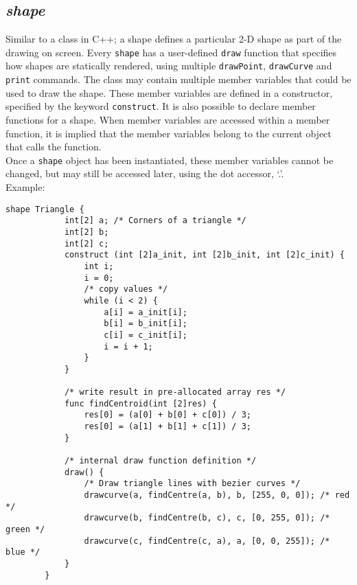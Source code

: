 \documentclass[letterpaper,12pt]{article}
\begin{document}
    \subsection{\textit{shape}}
    Similar to a class in C++; a shape defines a particular 2-D shape as part of the drawing on screen. Every \texttt{shape} has a user-defined \texttt{draw} function that specifies how shapes are statically rendered, using multiple \texttt{drawPoint}, \texttt{drawCurve} and \texttt{print} commands. The class may contain multiple member variables that could be used to draw the shape. These member variables are defined in a constructor, specified by the keyword \texttt{construct}. It is also possible to declare member functions for a shape. When member variables are accessed within a member function, it is implied that the member variables belong to the current object that calls the function.\\
    Once a \texttt{shape} object has been instantiated, these member variables cannot be changed, but may still be accessed later, using the dot accessor, `.'.\\
    Example:\\
    \begin{lstlisting}[style=sol]
        shape Triangle {
            int[2] a; /* Corners of a triangle */
            int[2] b;
            int[2] c;
            construct (int [2]a_init, int [2]b_init, int [2]c_init) {
                int i;
                i = 0;
                /* copy values */
                while (i < 2) {
                    a[i] = a_init[i];
                    b[i] = b_init[i];
                    c[i] = c_init[i];
                    i = i + 1;
                }
            }
        
            /* write result in pre-allocated array res */
            func findCentroid(int [2]res) {
                res[0] = (a[0] + b[0] + c[0]) / 3;
                res[0] = (a[1] + b[1] + c[1]) / 3;
            }

            /* internal draw function definition */
            draw() {
                /* Draw triangle lines with bezier curves */
                drawcurve(a, findCentre(a, b), b, [255, 0, 0]); /* red */
                drawcurve(b, findCentre(b, c), c, [0, 255, 0]); /* green */
                drawcurve(c, findCentre(c, a), a, [0, 0, 255]); /* blue */
            }
        }
    \end{lstlisting}
\end{document}
